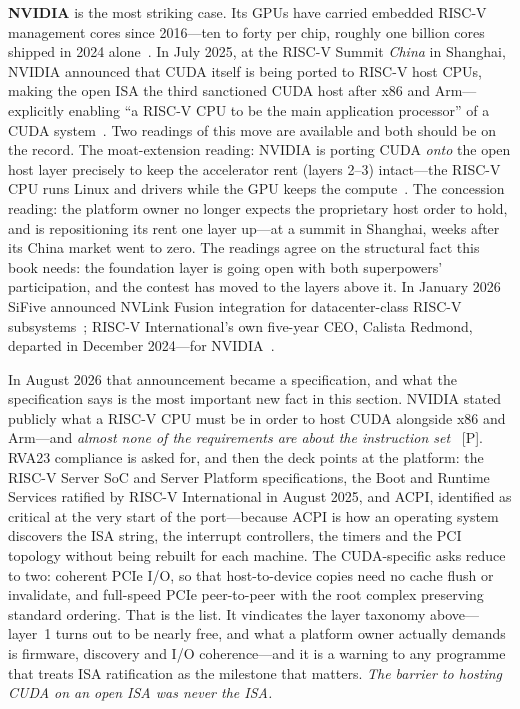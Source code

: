 \textbf{NVIDIA} is the most striking case. Its GPUs have carried embedded RISC-V management cores since 2016---ten to forty per chip, roughly one billion cores shipped in 2024 alone~\cite{nvidia-riscv-cores}. In July 2025, at the RISC-V Summit \emph{China} in Shanghai, NVIDIA announced that CUDA itself is being ported to RISC-V host CPUs, making the open ISA the third sanctioned CUDA host after x86 and Arm---explicitly enabling ``a RISC-V CPU to be the main application processor'' of a CUDA system~\cite{cuda-riscv}. Two readings of this move are available and both should be on the record. The moat-extension reading: NVIDIA is porting CUDA \emph{onto} the open host layer precisely to keep the accelerator rent (layers 2--3) intact---the RISC-V CPU runs Linux and drivers while the GPU keeps the compute~\cite{cuda-riscv-analysis}. The concession reading: the platform owner no longer expects the proprietary host order to hold, and is repositioning its rent one layer up---at a summit in Shanghai, weeks after its China market went to zero. The readings agree on the structural fact this book needs: the foundation layer is going open with both superpowers' participation, and the contest has moved to the layers above it. In January 2026 SiFive announced NVLink Fusion integration for datacenter-class RISC-V subsystems~\cite{sifive-nvlink}; RISC-V International's own five-year CEO, Calista Redmond, departed in December 2024---for NVIDIA~\cite{redmond}.

In August 2026 that announcement became a specification, and what the specification says is the most important new fact in this section. NVIDIA stated publicly what a RISC-V CPU must be in order to host CUDA alongside x86 and Arm---and \emph{almost none of the requirements are about the instruction set}~\cite{hc2026-nv-riscv} [P]. RVA23 compliance is asked for, and then the deck points at the platform: the RISC-V Server SoC and Server Platform specifications, the Boot and Runtime Services ratified by RISC-V International in August 2025, and ACPI, identified as critical at the very start of the port---because ACPI is how an operating system discovers the ISA string, the interrupt controllers, the timers and the PCI topology without being rebuilt for each machine. The CUDA-specific asks reduce to two: coherent PCIe I/O, so that host-to-device copies need no cache flush or invalidate, and full-speed PCIe peer-to-peer with the root complex preserving standard ordering. That is the list. It vindicates the layer taxonomy above---layer~1 turns out to be nearly free, and what a platform owner actually demands is firmware, discovery and I/O coherence---and it is a warning to any programme that treats ISA ratification as the milestone that matters. \emph{The barrier to hosting CUDA on an open ISA was never the ISA.}

